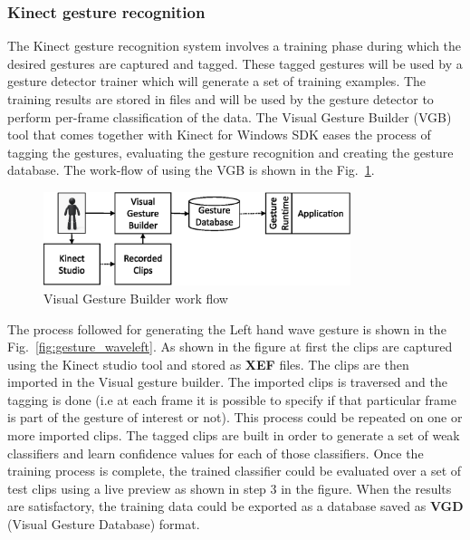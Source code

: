 \subsubsection{Kinect gesture recognition}
\label{sssec:kinect_gestures}
The Kinect gesture recognition system involves a training phase during which the desired gestures are captured and tagged. These tagged gestures will be used by a gesture detector trainer which will generate a set of training examples. The training results are stored in files and will be used by the gesture detector to perform per-frame classification of the data. The Visual Gesture Builder (VGB) tool that comes together with Kinect for Windows SDK eases the process of tagging the gestures, evaluating the gesture recognition and creating the gesture database. The work-flow of using the VGB is shown in the Fig.~\ref{fig:vgb_workflow}.
\begin{figure}[H]
\centering
\includegraphics[width=0.8\textwidth]{assets/vgb_flow.eps}
\caption[Visual Gesture Builder work flow]{Visual Gesture Builder work flow \cite{KinectSDK2014}}
\label{fig:vgb_workflow}
\end{figure}
The process followed for generating the Left hand wave gesture is shown in the Fig.~\ref{fig:gesture_waveleft}. As shown in the figure at first the clips are captured using the Kinect studio tool and stored as \textbf{XEF} files. The clips are then imported in the Visual gesture builder. The imported clips is traversed and the tagging is done (i.e at each frame it is possible to specify if that particular frame is part of the gesture of interest or not). This process could be repeated on one or more imported clips. The tagged clips are built in order to generate a set of weak classifiers and learn confidence values for each of those classifiers. Once the training process is complete, the trained classifier could be evaluated over a set of test clips using a live preview as shown in step 3 in the figure. When the results are satisfactory, the training data could be exported as a database saved as \textbf{VGD} (Visual Gesture Database) format.
